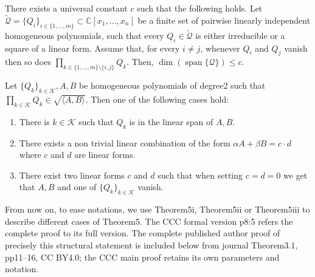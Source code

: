 \setcounter{theorem}{3}
\begin{theorem}\label{thm:main-sg-intro}
There exists a universal constant $c$ such that the following holds. Let $\widetilde{\mathcal Q}=\{Q_i\}_{i\in\{1,\ldots,m\}}\subset\mathbb C[x_1,\ldots,x_n]$ be a finite set of pairwise linearly independent homogeneous polynomials, such that every $Q_i\in\widetilde{\mathcal Q}$ is either irreducible or a square of a linear form. Assume that, for every $i\ne j$, whenever $Q_i$ and $Q_j$ vanish then so does $\prod_{k\in\{1,\ldots,m\}\setminus\{i,j\}}Q_k$. Then, $\dim(\operatorname{span}\{\mathcal Q\})\leq c$.
\end{theorem}
\begin{theorem}\label{thm:structure}\label{thm:structure-intro}
Let $\{Q_k\}_{k\in\mathcal K},A,B$ be homogeneous polynomials of degree2 such that $\prod_{k\in\mathcal K}Q_k\in\sqrt{\langle A,B\rangle}$. Then one of the following cases hold:
\begin{enumerate}[label={(\roman*)}]
\item\label{case:span} There is $k\in\mathcal K$ such that $Q_k$ is in the linear span of $A,B$.
\item\label{case:rk1} There exists a non trivial linear combination of the form $\alpha A+\beta B=c\cdot d$ where $c$ and $d$ are linear forms.
\item\label{case:2} There exist two linear forms $c$ and $d$ such that when setting $c=d=0$ we get that $A,B$ and one of $\{Q_k\}_{k\in\mathcal K}$ vanish.
\end{enumerate}
\end{theorem}
From now on, to ease notations, we use Theorem5i, Theorem5ii or Theorem5iii to describe different cases of Theorem5. The CCC formal version p8:5 refers the complete proof to its full version. The complete published author proof of precisely this structural statement is included below from journal Theorem3.1, pp11--16, CC BY4.0; the CCC main proof retains its own parameters and notation.
